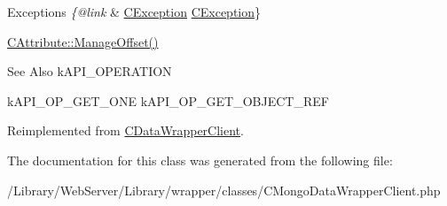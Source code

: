 \begin{DoxyExceptions}{Exceptions}
{\em \{@link} & \hyperlink{class_c_exception}{C\-Exception} \hyperlink{class_c_exception}{C\-Exception}\}\\
\hline
\end{DoxyExceptions}
\hyperlink{class_c_attribute_a9d231a47718719fcd6c33f3d0ac91675}{C\-Attribute\-::\-Manage\-Offset()}

\begin{DoxySeeAlso}{See Also}
k\-A\-P\-I\-\_\-\-O\-P\-E\-R\-A\-T\-I\-O\-N 

k\-A\-P\-I\-\_\-\-O\-P\-\_\-\-G\-E\-T\-\_\-\-O\-N\-E k\-A\-P\-I\-\_\-\-O\-P\-\_\-\-G\-E\-T\-\_\-\-O\-B\-J\-E\-C\-T\-\_\-\-R\-E\-F 
\end{DoxySeeAlso}


Reimplemented from \hyperlink{class_c_data_wrapper_client_ae7cad4809c20d8f2871cfe00da909d67}{C\-Data\-Wrapper\-Client}.



The documentation for this class was generated from the following file\-:\begin{DoxyCompactItemize}
\item 
/\-Library/\-Web\-Server/\-Library/wrapper/classes/C\-Mongo\-Data\-Wrapper\-Client.\-php\end{DoxyCompactItemize}
